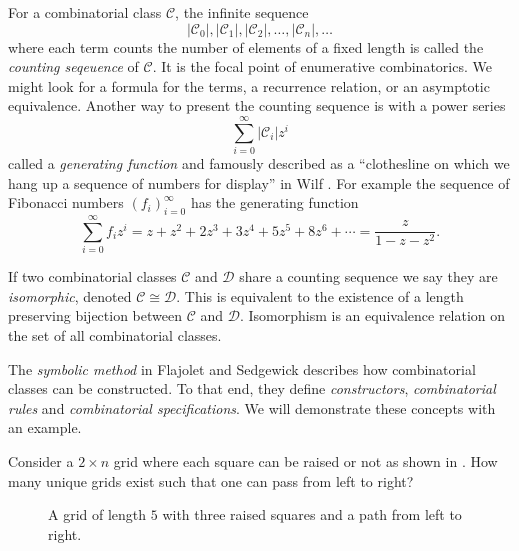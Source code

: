For a combinatorial class $\mathcal{C}$, the infinite sequence 
\[
    |\mathcal{C}_0|, |\mathcal{C}_1|, |\mathcal{C}_2|,\dotsc,|\mathcal{C}_n|,\dotsc
\]
where each term counts the number of elements of a fixed length is called the \emph{counting seqeuence} of $\mathcal{C}$. It is the focal point of enumerative combinatorics. We might look for a formula for the terms, a recurrence relation, or an asymptotic equivalence. Another way to present the counting sequence is with a power series
\[
    \sum_{i=0}^\infty |\mathcal{C}_i|z^i
\]
called a \emph{generating function} and famously described as a ``clothesline on which we hang up a sequence of numbers for display'' in Wilf \cite{wilf:gf}. For example the sequence of Fibonacci numbers $\left(f_i\right)_{i=0}^\infty$ has the generating function
\[
    \sum_{i=0}^\infty f_iz^i =  z + z^2 + 2z^3 + 3z^4 + 5z^5 + 8z^6 + \dotsb = \frac{z}{1-z-z^2}.
\]

If two combinatorial classes $\mathcal{C}$ and $\mathcal{D}$ share a counting sequence we say they are \emph{isomorphic}, denoted $\mathcal{C} \cong \mathcal{D}$. This is equivalent to the existence of a length preserving bijection between $\mathcal{C}$ and $\mathcal{D}$. Isomorphism is an equivalence relation on the set of all combinatorial classes.

The \emph{symbolic method} in Flajolet and Sedgewick \cite{flajolet:ac} describes how combinatorial classes can be constructed. To that end, they define \emph{constructors}, \emph{combinatorial rules} and \emph{combinatorial specifications}. We will demonstrate these concepts with an example. 

Consider a $2 \times n$ grid where each square can be raised or not as shown in . How many unique grids exist such that one can pass from left to right?

\begin{figure}[ht!]
    \centering
    
    \caption{A grid of length $5$ with three raised squares and a path from left to right.}
    \label{fig:raised_grid}
\end{figure}

